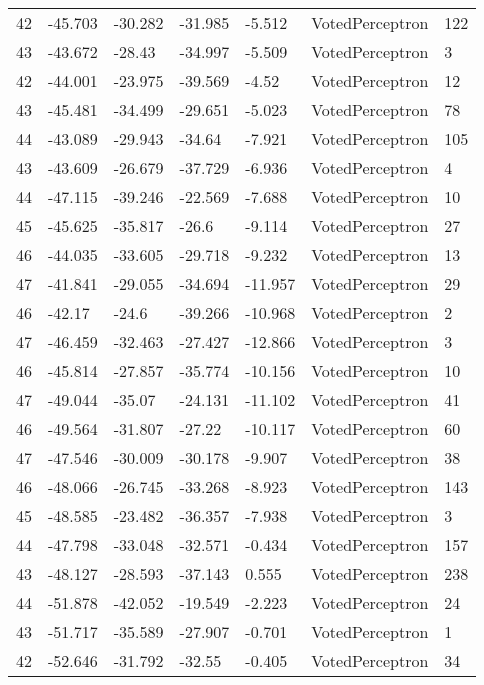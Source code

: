 \begin{tabular}{lllllll}
42 & -45.703 & -30.282 & -31.985 &  -5.512 &    VotedPerceptron &  122 \\
43 & -43.672 &  -28.43 & -34.997 &  -5.509 &    VotedPerceptron &    3 \\
42 & -44.001 & -23.975 & -39.569 &   -4.52 &    VotedPerceptron &   12 \\
43 & -45.481 & -34.499 & -29.651 &  -5.023 &    VotedPerceptron &   78 \\
44 & -43.089 & -29.943 &  -34.64 &  -7.921 &    VotedPerceptron &  105 \\
43 & -43.609 & -26.679 & -37.729 &  -6.936 &    VotedPerceptron &    4 \\
44 & -47.115 & -39.246 & -22.569 &  -7.688 &    VotedPerceptron &   10 \\
45 & -45.625 & -35.817 &   -26.6 &  -9.114 &    VotedPerceptron &   27 \\
46 & -44.035 & -33.605 & -29.718 &  -9.232 &    VotedPerceptron &   13 \\
47 & -41.841 & -29.055 & -34.694 & -11.957 &    VotedPerceptron &   29 \\
46 &  -42.17 &   -24.6 & -39.266 & -10.968 &    VotedPerceptron &    2 \\
47 & -46.459 & -32.463 & -27.427 & -12.866 &    VotedPerceptron &    3 \\
46 & -45.814 & -27.857 & -35.774 & -10.156 &    VotedPerceptron &   10 \\
47 & -49.044 &  -35.07 & -24.131 & -11.102 &    VotedPerceptron &   41 \\
46 & -49.564 & -31.807 &  -27.22 & -10.117 &    VotedPerceptron &   60 \\
47 & -47.546 & -30.009 & -30.178 &  -9.907 &    VotedPerceptron &   38 \\
46 & -48.066 & -26.745 & -33.268 &  -8.923 &    VotedPerceptron &  143 \\
45 & -48.585 & -23.482 & -36.357 &  -7.938 &    VotedPerceptron &    3 \\
44 & -47.798 & -33.048 & -32.571 &  -0.434 &    VotedPerceptron &  157 \\
43 & -48.127 & -28.593 & -37.143 &   0.555 &    VotedPerceptron &  238 \\
44 & -51.878 & -42.052 & -19.549 &  -2.223 &    VotedPerceptron &   24 \\
43 & -51.717 & -35.589 & -27.907 &  -0.701 &    VotedPerceptron &    1 \\
42 & -52.646 & -31.792 &  -32.55 &  -0.405 &    VotedPerceptron &   34 \\

\end{tabular}
